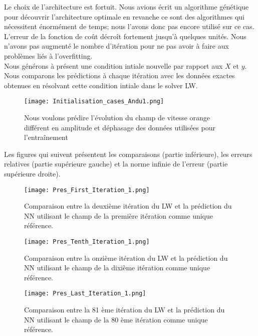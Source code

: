 \documentclass[a4paper,12pt]{article}
\numberwithin{equation}{section} %
\begin{document}
\noindent Le choix de l'architecture est fortuit. Nous avions écrit un algorithme génétique pour découvrir l'architecture optimale en revanche ce sont des algorithmes qui nécessitent énormément de temps; nous l'avons donc pas encore utilisé sur ce cas.\\
L'erreur de la fonction de coût décroît fortement jusqu'à quelques unités. Nous n'avons pas augmenté le nombre d'itération pour ne pas avoir à faire aux problèmes liés à l'overfitting.\\

\noindent Nous générons à présent une condition intiale nouvelle par rapport aux $X$  et $y$. Nous comparons les prédictions à chaque itération avec les données exactes obtenues en résolvant cette condition intiale dans le solver LW. \\
\begin{figure}[!ht]
\centering
\texttt{[image: Initialisation\_cases\_Andu1.png]}
\caption{\small{Nous voulons prédire l'évolution du champ de vitesse orange différent en amplitude et déphasage des données utilisées pour l'entraînement}}
\label{newinputNN}
\end{figure}

\noindent Les figures qui suivent présentent les comparaisons (partie inférieure), les erreurs relatives (partie supérieure gauche) et la norme infinie de l'erreur (partie supérieure droite).

\begin{figure}[!ht]
	\centering
	\texttt{[image: Pres\_First\_Iteration\_1.png]}
	\caption{\small{Comparaison entre la deuxième itération du LW et la prédiction du NN utilisant le champ de la première itération comme unique référence.}}
	\label{FirstItNewNN1}
\end{figure} 

\pagebreak

\begin{figure}[!ht]
	\centering
	\texttt{[image: Pres\_Tenth\_Iteration\_1.png]}
	\caption{\small{Comparaison entre la onzième itération du LW et la prédiction du NN utilisant le champ de la dixième itération comme unique référence.}}
	\label{10ItNewNN1}
\end{figure} 

\begin{figure}[!ht]
	\centering
	\texttt{[image: Pres\_Last\_Iteration\_1.png]}
	\caption{\small{Comparaison entre la 81 ème itération du LW et la prédiction du NN utilisant le champ de la 80 ème itération comme unique référence.}}
	\label{LastItNewNN1}
\end{figure}
\end{document}
